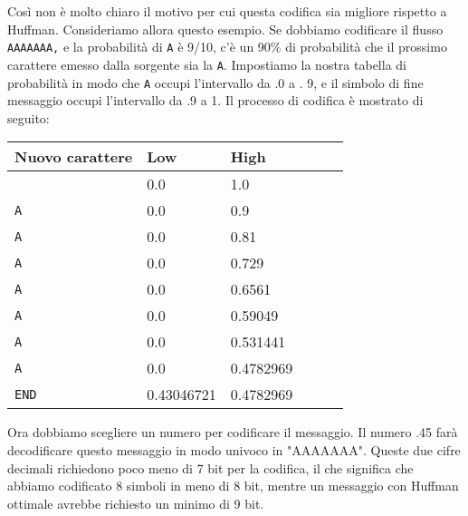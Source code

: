 Così non è molto chiaro il motivo per cui questa codifica sia migliore rispetto a Huffman. Consideriamo allora questo esempio. Se dobbiamo
codificare il flusso \texttt{AAAAAAA,} e la probabilità di \texttt{A} è 9/10, c'è un 90\% di probabilità che il prossimo carattere emesso dalla sorgente sia la \texttt{A}. Impostiamo la nostra tabella di probabilità in modo che \texttt{A} occupi l'intervallo da .0 a . 9, e il simbolo di fine messaggio occupi l'intervallo da .9 a 1. Il processo di codifica è mostrato di seguito: 

\begin{table}[bhtp!]
\begin{tabular}{llllll} 
\hline
\textbf{Nuovo carattere} & \textbf{Low} & \textbf{High} &  &  &   \\ 
\hline
                         & 0.0          & 1.0           &  &  &   \\
\texttt{A}                        & 0.0          & 0.9           &  &  &   \\
\texttt{A}                        & 0.0          & 0.81          &  &  &   \\
\texttt{A}                        & 0.0          & 0.729         &  &  &   \\
\texttt{A}                        & 0.0          & 0.6561        &  &  &   \\
\texttt{A}                        & 0.0          & 0.59049       &  &  &   \\
\texttt{A}                        & 0.0          & 0.531441      &  &  &   \\
\texttt{A}                        & 0.0          & 0.4782969     &  &  &   \\
\texttt{END}                      & 0.43046721   & 0.4782969     &  &  &  
\end{tabular}
\end{table}

\FloatBarrier

Ora dobbiamo scegliere un numero per codificare il messaggio. Il numero .45 farà decodificare questo messaggio in modo univoco in "AAAAAAA". Queste due cifre decimali richiedono poco meno di 7 bit per la codifica, il che significa che abbiamo codificato 8 simboli in meno di 8 bit, mentre un messaggio con Huffman ottimale avrebbe richiesto un minimo di 9 bit.

\vspace{5mm}

